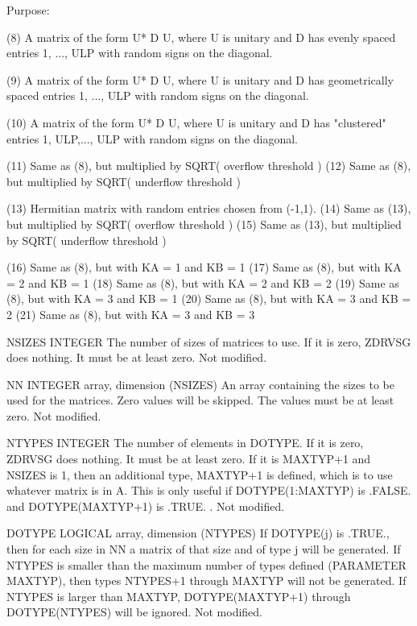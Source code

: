 \begin{DoxyParagraph}{Purpose\+: }
\begin{DoxyVerb}
      (8)  A matrix of the form  U* D U, where U is unitary and
           D has evenly spaced entries 1, ..., ULP with random signs
           on the diagonal.

      (9)  A matrix of the form  U* D U, where U is unitary and
           D has geometrically spaced entries 1, ..., ULP with random
           signs on the diagonal.

      (10) A matrix of the form  U* D U, where U is unitary and
           D has "clustered" entries 1, ULP,..., ULP with random
           signs on the diagonal.

      (11) Same as (8), but multiplied by SQRT( overflow threshold )
      (12) Same as (8), but multiplied by SQRT( underflow threshold )

      (13) Hermitian matrix with random entries chosen from (-1,1).
      (14) Same as (13), but multiplied by SQRT( overflow threshold )
      (15) Same as (13), but multiplied by SQRT( underflow threshold )

      (16) Same as (8), but with KA = 1 and KB = 1
      (17) Same as (8), but with KA = 2 and KB = 1
      (18) Same as (8), but with KA = 2 and KB = 2
      (19) Same as (8), but with KA = 3 and KB = 1
      (20) Same as (8), but with KA = 3 and KB = 2
      (21) Same as (8), but with KA = 3 and KB = 3\end{DoxyVerb}
 \begin{DoxyVerb}  NSIZES  INTEGER
          The number of sizes of matrices to use.  If it is zero,
          ZDRVSG does nothing.  It must be at least zero.
          Not modified.

  NN      INTEGER array, dimension (NSIZES)
          An array containing the sizes to be used for the matrices.
          Zero values will be skipped.  The values must be at least
          zero.
          Not modified.

  NTYPES  INTEGER
          The number of elements in DOTYPE.   If it is zero, ZDRVSG
          does nothing.  It must be at least zero.  If it is MAXTYP+1
          and NSIZES is 1, then an additional type, MAXTYP+1 is
          defined, which is to use whatever matrix is in A.  This
          is only useful if DOTYPE(1:MAXTYP) is .FALSE. and
          DOTYPE(MAXTYP+1) is .TRUE. .
          Not modified.

  DOTYPE  LOGICAL array, dimension (NTYPES)
          If DOTYPE(j) is .TRUE., then for each size in NN a
          matrix of that size and of type j will be generated.
          If NTYPES is smaller than the maximum number of types
          defined (PARAMETER MAXTYP), then types NTYPES+1 through
          MAXTYP will not be generated.  If NTYPES is larger
          than MAXTYP, DOTYPE(MAXTYP+1) through DOTYPE(NTYPES)
          will be ignored.
          Not modified.


\end{DoxyVerb}
\end{DoxyParagraph}
